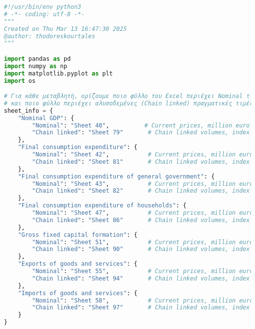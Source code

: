 \documentclass{book}
\begin{document}
\begin{tcolorbox}[colback=white,colframe=black,title=Φόρτωση Βιβλιοθηκών \& Εισαγωγή \texttt{sheet\_info}]
\begin{lstlisting}[language=Python]
#!/usr/bin/env python3
# -*- coding: utf-8 -*-
"""
Created on Thu Mar 13 16:47:30 2025
@author: thodoreskourtales
"""

import pandas as pd
import numpy as np
import matplotlib.pyplot as plt
import os

# Για κάθε μεταβλητή, ορίζουμε ποιο φύλλο του Excel περιέχει Nominal τιμές
# και ποιο φύλλο περιέχει αλυσοδεμένες (Chain linked) πραγματικές τιμές.
sheet_info = {
    "Nominal GDP": {
        "Nominal": "Sheet 40",          # Current prices, million euro (Gross domestic product at market prices)
        "Chain linked": "Sheet 79"       # Chain linked volumes, index 2015=100 (Gross domestic product at market prices)
    },
    "Final consumption expenditure": {
        "Nominal": "Sheet 42",           # Current prices, million euro (Final consumption expenditure)
        "Chain linked": "Sheet 81"       # Chain linked volumes, index 2015=100 (Final consumption expenditure)
    },
    "Final consumption expenditure of general government": {
        "Nominal": "Sheet 43",           # Current prices, million euro (Final consumption expenditure of general government)
        "Chain linked": "Sheet 82"       # Chain linked volumes, index 2015=100 (Final consumption expenditure of general government)
    },
    "Final consumption expenditure of households": {
        "Nominal": "Sheet 47",           # Current prices, million euro (Final consumption expenditure of households)
        "Chain linked": "Sheet 86"       # Chain linked volumes, index 2015=100 (Final consumption expenditure of households)
    },
    "Gross fixed capital formation": {
        "Nominal": "Sheet 51",           # Current prices, million euro (Gross fixed capital formation)
        "Chain linked": "Sheet 90"       # Chain linked volumes, index 2015=100 (Gross fixed capital formation)
    },
    "Exports of goods and services": {
        "Nominal": "Sheet 55",           # Current prices, million euro (Exports of goods and services)
        "Chain linked": "Sheet 94"       # Chain linked volumes, index 2015=100 (Exports of goods and services)
    },
    "Imports of goods and services": {
        "Nominal": "Sheet 58",           # Current prices, million euro (Imports of goods and services)
        "Chain linked": "Sheet 97"       # Chain linked volumes, index 2015=100 (Imports of goods and services)
    }
}

\end{lstlisting}
\end{tcolorbox}
\end{document}
